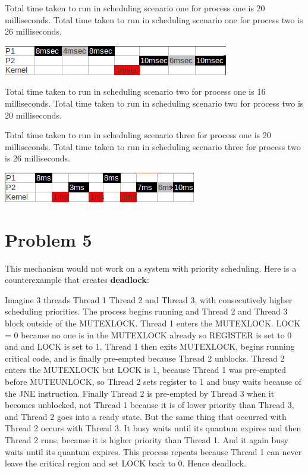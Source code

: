 \documentclass[11pt]{article} %
\begin{document}
\bigskip

\noindent Total time taken to run in scheduling scenario one for process one is 20 milliseconds. Total time taken to run in scheduling scenario one for process two is 26 milliseconds. 

\bigskip

\noindent \includegraphics{one.png}

\bigskip\bigskip

\noindent Total time taken to run in scheduling scenario two for process one is 16 milliseconds. Total time taken to run in scheduling scenario two for process two is 20 milliseconds.

\bigskip

\noindent {}

\bigskip

\noindent Total time taken to run in scheduling scenario three for process one is 20 milliseconds. Total time taken to run in scheduling scenario three for process two is 26 milliseconds.

\bigskip

\noindent \includegraphics{three.png}

\bigskip



\section*{Problem 5}

This mechanism would not work on a system with priority scheduling. Here is a counterexample that creates \textbf{deadlock}:
\bigskip

\noindent Imagine 3 threads Thread 1 Thread 2 and Thread 3, with consecutively higher scheduling priorities. The process begins running and Thread 2 and Thread 3 block outside of the MUTEXLOCK. Thread 1 enters the MUTEXLOCK. LOCK = 0 because no one is in the MUTEXLOCK already so REGISTER is set to 0 and and LOCK is set to 1. Thread 1 then exits MUTEXLOCK, begins running critical code, and is finally pre-empted because Thread 2 unblocks. Thread 2 enters the MUTEXLOCK but LOCK is 1, because Thread 1 was pre-empted before MUTEUNLOCK, so Thread 2 sets register to 1 and busy waits because of the JNE instruction. Finally Thread 2 is pre-empted by Thread 3 when it becomes unblocked, not Thread 1 because it is of lower priority than Thread 3, and Thread 2 goes into a ready state. But the same thing that occurred with Thread 2 occurs with Thread 3. It busy waits until its quantum expires and then Thread 2 runs, because it is higher priority than Thread 1. And it again busy waits until its quantum expires. This process repeats because Thread 1 can never leave the critical region and set LOCK back to 0. Hence deadlock. 
\end{document}
